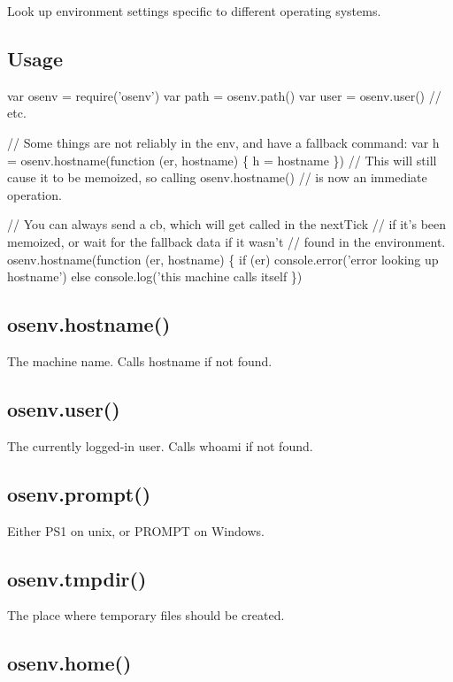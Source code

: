 Look up environment settings specific to different operating systems.

\subsection*{Usage}


\begin{DoxyCode}
var osenv = require('osenv')
var path = osenv.path()
var user = osenv.user()
// etc.

// Some things are not reliably in the env, and have a fallback command:
var h = osenv.hostname(function (er, hostname) \{
  h = hostname
\})
// This will still cause it to be memoized, so calling osenv.hostname()
// is now an immediate operation.

// You can always send a cb, which will get called in the nextTick
// if it's been memoized, or wait for the fallback data if it wasn't
// found in the environment.
osenv.hostname(function (er, hostname) \{
  if (er) console.error('error looking up hostname')
  else console.log('this machine calls itself %
\})
\end{DoxyCode}


\subsection*{osenv.\+hostname()}

The machine name. Calls {\ttfamily hostname} if not found.

\subsection*{osenv.\+user()}

The currently logged-\/in user. Calls {\ttfamily whoami} if not found.

\subsection*{osenv.\+prompt()}

Either P\+S1 on unix, or P\+R\+O\+M\+PT on Windows.

\subsection*{osenv.\+tmpdir()}

The place where temporary files should be created.

\subsection*{osenv.\+home()}

